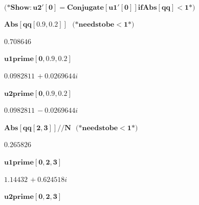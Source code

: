 {\begin{doublespace}
\noindent\(\pmb{\text{}}\)
\end{doublespace}

\begin{doublespace}
\noindent\(\pmb{\text{(*} \text{Show}: \text{u2}'[0] = \text{Conjugate}[\text{u1}'[0]] \text{if} \text{Abs}[\text{qq}]<1 \text{*)}}\)
\end{doublespace}

\begin{doublespace}
\noindent\(\pmb{\text{Abs}[\text{qq}[0.9,0.2]]\text{    }\text{(*} \text{needs} \text{to} \text{be} <1 \text{*)}}\)
\end{doublespace}

\begin{doublespace}
\noindent\(0.708646\)
\end{doublespace}

\begin{doublespace}
\noindent\(\pmb{\text{u1prime}[0,0.9,0.2]}\)
\end{doublespace}

\begin{doublespace}
\noindent\(0.0982811\, +0.0269644 i\)
\end{doublespace}

\begin{doublespace}
\noindent\(\pmb{\text{u2prime}[0,0.9,0.2]}\)
\end{doublespace}

\begin{doublespace}
\noindent\(0.0982811\, -0.0269644 i\)
\end{doublespace}

\begin{doublespace}
\noindent\(\pmb{\text{Abs}[\text{qq}[2,3]] \text{//}N\text{   }\text{(*} \text{needs} \text{to} \text{be} <1 \text{*)}}\)
\end{doublespace}

\begin{doublespace}
\noindent\(0.265826\)
\end{doublespace}

\begin{doublespace}
\noindent\(\pmb{\text{u1prime}[0,2,3]}\)
\end{doublespace}

\begin{doublespace}
\noindent\(1.14432\, +0.624518 i\)
\end{doublespace}

\begin{doublespace}
\noindent\(\pmb{\text{u2prime}[0,2,3]}\)
\end{doublespace}

}
